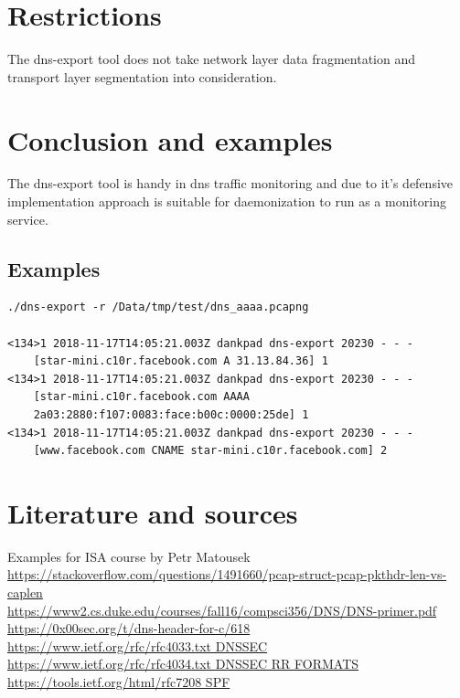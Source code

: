 \documentclass[a4paper, 12pt]{article}
\begin{document}
\section{Restrictions}
The dns-export tool does not take network layer data fragmentation and transport layer segmentation into consideration.
\section{Conclusion and examples}
The dns-export tool is handy in dns traffic monitoring and due to it's defensive implementation approach
is suitable for daemonization to run as a monitoring service.
\subsection{Examples}
\begin{lstlisting}
./dns-export -r /Data/tmp/test/dns_aaaa.pcapng

<134>1 2018-11-17T14:05:21.003Z dankpad dns-export 20230 - - -
    [star-mini.c10r.facebook.com A 31.13.84.36] 1
<134>1 2018-11-17T14:05:21.003Z dankpad dns-export 20230 - - -
    [star-mini.c10r.facebook.com AAAA
    2a03:2880:f107:0083:face:b00c:0000:25de] 1
<134>1 2018-11-17T14:05:21.003Z dankpad dns-export 20230 - - -
    [www.facebook.com CNAME star-mini.c10r.facebook.com] 2
\end{lstlisting}
\section{Literature and sources}
Examples for ISA course by Petr Matousek\\
\url{https://stackoverflow.com/questions/1491660/pcap-struct-pcap-pkthdr-len-vs-caplen}\\
\url{https://www2.cs.duke.edu/courses/fall16/compsci356/DNS/DNS-primer.pdf}\\
\url{https://0x00sec.org/t/dns-header-for-c/618}\\
\url{https://www.ietf.org/rfc/rfc4033.txt DNSSEC}\\
\url{https://www.ietf.org/rfc/rfc4034.txt DNSSEC RR FORMATS}\\
\url{https://tools.ietf.org/html/rfc7208 SPF}\\
\end{document}
